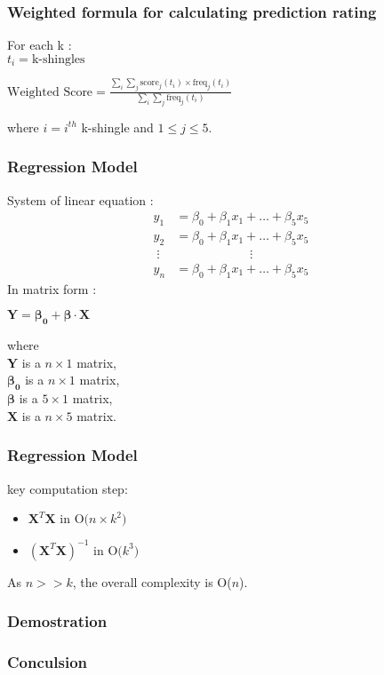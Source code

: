 \documentclass[11pt]{beamer}
\begin{document}
\begin{frame}
\frametitle{Weighted formula for calculating prediction rating}
\begin{tcolorbox}[colback=blue!5,colframe=blue!40!black,title=Weighted formula]

For each k : \\
\(t_{i} = \mbox{k-shingles}\)

\centering
\(\mbox{Weighted Score} = \frac{\displaystyle\sum_i \sum_j \mbox{score}_j(t_{i}) \times \mbox{freq}_j(t_{i})}{\displaystyle\sum_i \sum_j \mbox{freq}_j(t_{i})}\)

\raggedright
where \(i = i^{th}\) k-shingle and \(1 \leq j \leq 5\).

\end{tcolorbox}

\end{frame}

\begin{frame}
\frametitle{Regression Model}
\begin{tcolorbox}[colback=blue!5,colframe=blue!40!black,title=Regression model]
System of linear equation :
\begin{equation}
\begin{alignedat}{4}
y_1 &= \beta_0  + \beta_1 x_1 + \dots + \beta_5 x_5\\
y_2 &= \beta_0 + \beta_1 x_1 + \dots + \beta_5 x_5\\
\;\vdots  &            \qquad\qquad\qquad\vdots \\
y_n &= \beta_0 + \beta_1 x_1 + \dots + \beta_5 x_5
\end{alignedat}
\end{equation}
In matrix form :

\centering
\(\textbf{Y}= \boldsymbol{\beta_0}+\boldsymbol{\beta} \cdot \textbf{X}\)

\raggedright
where\\
\(\textbf{Y}\) is a \(n\times1\) matrix,\\
\(\boldsymbol{\beta_0}\) is a \(n\times 1\) matrix,\\
\(\boldsymbol{\beta}\) is a \(5\times 1\) matrix,\\
\(\textbf{X}\) is a \(n\times 5\) matrix.
\end{tcolorbox}
\end{frame}

\begin{frame}
\frametitle{Regression Model}
\begin{tcolorbox}[colback=blue!5,colframe=blue!40!black,title=Complexity]
key computation step:
\begin{itemize}
\item \(\textbf{X}^T\textbf{X} \mbox{ in O(} n\times k^2 \mbox{)}\)
\item \((\textbf{X}^T\textbf{X})^{-1} \mbox{ in O(} k^3 \mbox{)}\)
\end{itemize}
As \(n>>k\), the overall complexity is O(\(n\)).
\end{tcolorbox}
\end{frame}

\begin{frame}
\frametitle{Demostration}

\end{frame}

\begin{frame}
\frametitle{Conculsion}

\end{frame}
\end{document}
